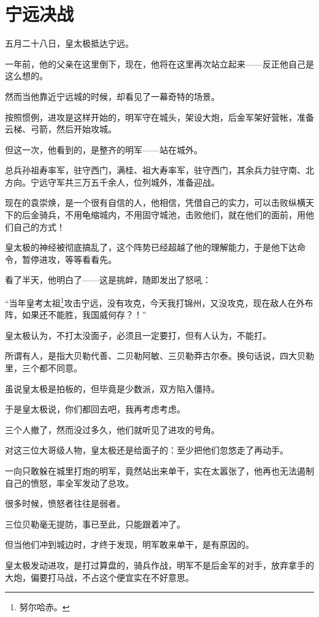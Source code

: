 \section{宁远决战}
\ifnum{}
	\begin{multicols}{\theparacolNo}
\fi
五月二十八日，皇太极抵达宁远。

一年前，他的父亲在这里倒下，现在，他将在这里再次站立起来——反正他自己是这么想的。

然而当他靠近宁远城的时候，却看见了一幕奇特的场景。

按照惯例，进攻是这样开始的，明军守在城头，架设大炮，后金军架好营帐，准备云梯、弓箭，然后开始攻城。

但这一次，他看到的，是整齐的明军——站在城外。

总兵孙祖寿率军，驻守西门，满桂、祖大寿率军，驻守西门，其余兵力驻守南、北方向。宁远守军共三万五千余人，位列城外，准备迎战。

现在的袁崇焕，是一个很有自信的人，他相信，凭借自己的实力，可以击败纵横天下的后金骑兵，不用龟缩城内，不用固守城池，击败他们，就在他们的面前，用他们自己的方式！

皇太极的神经被彻底搞乱了，这个阵势已经超越了他的理解能力，于是他下达命令，暂停进攻，等等看看先。

看了半天，他明白了——这是挑衅，随即发出了怒吼：

“当年皇考太祖\footnote{努尔哈赤。}攻击宁远，没有攻克，今天我打锦州，又没攻克，现在敌人在外布阵，如果还不能胜，我国威何存？！”

皇太极认为，不打太没面子，必须且一定要打，但有人认为，不能打。

所谓有人，是指大贝勒代善、二贝勒阿敏、三贝勒莽古尔泰。换句话说，四大贝勒里，三个都不同意。

虽说皇太极是拍板的，但毕竟是少数派，双方陷入僵持。

于是皇太极说，你们都回去吧，我再考虑考虑。

三个人撤了，然而没过多久，他们就听见了进攻的号角。

对这三位大哥级人物，皇太极还是给面子的：至少把他们忽悠走了再动手。

一向只敢躲在城里打炮的明军，竟然站出来单干，实在太嚣张了，他再也无法遏制自己的愤怒，率全军发动了总攻。

很多时候，愤怒者往往是弱者。

三位贝勒毫无提防，事已至此，只能跟着冲了。

但当他们冲到城边时，才终于发现，明军敢来单干，是有原因的。

皇太极发动进攻，是打过算盘的，骑兵作战，明军不是后金军的对手，放弃拿手的大炮，偏要打马战，不占这个便宜实在不好意思。


\end{multicols}
